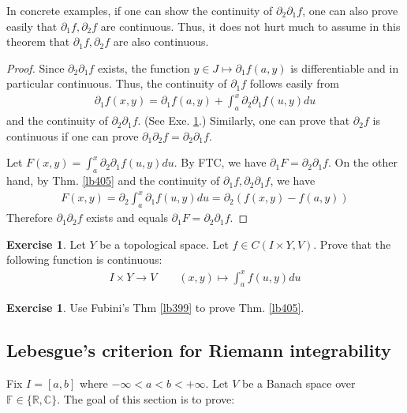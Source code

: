 \documentclass[12pt,b5paper,notitlepage]{article}
\theoremstyle{definition}
\newtheorem{exe}[df]{Exercise}
\theoremstyle{plain}
\newcommand{\Cbb}{\mathbb C}
\newcommand{\Rbb}{\mathbb R}
\newcommand{\Fbb}{\mathbb F}
\newcommand{\dps}{\displaystyle}
\numberwithin{equation}{section}
\begin{document}
In concrete examples, if one can show the continuity of $\partial_2\partial_1f$, one can also prove easily that $\partial_1f,\partial_2f$ are continuous. Thus, it does not hurt much to assume in this theorem that $\partial_1f,\partial_2f$ are also continuous.


\begin{proof}
Since $\partial_2\partial_1f$ exists, the function $y\in J\mapsto\partial_1f(a,y)$ is differentiable and in particular continuous. Thus, the continuity of $\partial_1f$ follows easily from
\begin{align*}
\partial_1f(x,y)=\partial_1f(a,y)+\int_a^x\partial_2\partial_1f(u,y)du
\end{align*}
and the continuity of $\partial_2\partial_1f$. (See Exe. \ref{lb408}.) Similarly, one can prove that $\partial_2f$ is continuous if one can prove $\partial_1\partial_2f=\partial_2\partial_1f$. 

Let $\dps F(x,y)=\int_a^x\partial_2\partial_1 f(u,y)du$. By FTC, we have $\partial_1F=\partial_2\partial_1f$. On the other hand, by Thm. \ref{lb405} and the continuity of $\partial_1f,\partial_2\partial_1f$, we have
\begin{align*}
F(x,y)=\partial_2\int_a^x\partial_1f(u,y)du=\partial_2(f(x,y)-f(a,y))
\end{align*}
Therefore $\partial_1\partial_2f$ exists and equals $\partial_1F=\partial_2\partial_1f$.
\end{proof}


\begin{exe}\label{lb408}
Let $Y$ be a topological space. Let $f\in C(I\times Y,V)$. Prove that the following function is continuous:
\begin{gather}
I\times Y\rightarrow V\qquad (x,y)\mapsto\int_a^x f(u,y)du
\end{gather}
\end{exe}



\begin{exe}
Use Fubini's Thm \ref{lb399} to prove Thm. \ref{lb405}.
\end{exe}




\subsection{Lebesgue's criterion for Riemann integrability}


Fix $I=[a,b]$ where $-\infty<a<b<+\infty$. Let $V$ be a Banach space over $\Fbb\in\{\Rbb,\Cbb\}$. The goal of this section is to prove:
\end{document}
